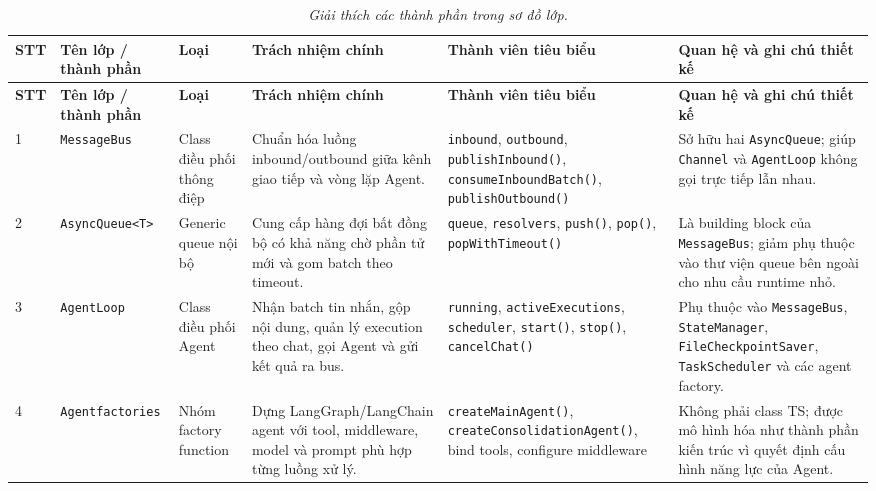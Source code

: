 \begin{longtable}{|p{0.55cm}|p{2.25cm}|p{1.95cm}|p{3.2cm}|p{3.0cm}|p{3.05cm}|}
\caption{\emph{Giải thích các thành phần trong sơ đồ lớp.}}\label{tab:class-diagram-components}\\
\hline
\textbf{STT} & \textbf{Tên lớp / thành phần} & \textbf{Loại} & \textbf{Trách nhiệm chính} & \textbf{Thành viên tiêu biểu} & \textbf{Quan hệ và ghi chú thiết kế} \\
\hline
\endfirsthead
\hline
\textbf{STT} & \textbf{Tên lớp / thành phần} & \textbf{Loại} & \textbf{Trách nhiệm chính} & \textbf{Thành viên tiêu biểu} & \textbf{Quan hệ và ghi chú thiết kế} \\
\hline
\endhead
1 & \texttt{MessageBus} & Class điều phối thông điệp & Chuẩn hóa luồng inbound/outbound giữa kênh giao tiếp và vòng lặp Agent. & \texttt{inbound}, \texttt{outbound}, \texttt{publishInbound()}, \texttt{consumeInbound}\newline\texttt{Batch()}, \texttt{publishOutbound()} & Sở hữu hai \texttt{AsyncQueue}; giúp \texttt{Channel} và \texttt{AgentLoop} không gọi trực tiếp lẫn nhau. \\
\hline
2 & \texttt{AsyncQueue<T>} & Generic queue nội bộ & Cung cấp hàng đợi bất đồng bộ có khả năng chờ phần tử mới và gom batch theo timeout. & \texttt{queue}, \texttt{resolvers}, \texttt{push()}, \texttt{pop()}, \texttt{popWithTimeout()} & Là building block của \texttt{MessageBus}; giảm phụ thuộc vào thư viện queue bên ngoài cho nhu cầu runtime nhỏ. \\
\hline
3 & \texttt{AgentLoop} & Class điều phối Agent & Nhận batch tin nhắn, gộp nội dung, quản lý execution theo chat, gọi Agent và gửi kết quả ra bus. & \texttt{running}, \texttt{active}\newline\texttt{Executions}, \texttt{scheduler}, \texttt{start()}, \texttt{stop()}, \texttt{cancelChat()} & Phụ thuộc vào \texttt{MessageBus}, \texttt{StateManager}, \texttt{FileCheckpoint}\newline\texttt{Saver}, \texttt{TaskScheduler} và các agent factory. \\
\hline
4 & \texttt{Agent}\newline\texttt{factories} & Nhóm factory function & Dựng LangGraph/LangChain agent với tool, middleware, model và prompt phù hợp từng luồng xử lý. & \texttt{createMain}\newline\texttt{Agent()}, \texttt{create}\newline\texttt{Consolidation}\newline\texttt{Agent()}, bind tools, configure middleware & Không phải class TS; được mô hình hóa như thành phần kiến trúc vì quyết định cấu hình năng lực của Agent. \\

\end{longtable}

